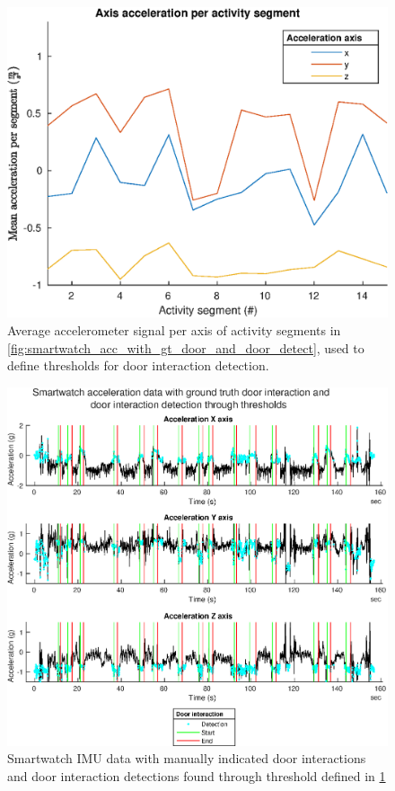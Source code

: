 \begin{figure}[H]
	\centering
	\includegraphics[width=0.6\linewidth]{images/20201114_1858_Axis_acceleration_per_activity_segment}
		\setlength{\belowcaptionskip}{-10pt}
	\caption{ Average accelerometer signal per axis of activity segments in \cref{fig:smartwatch_acc_with_gt_door_and_door_detect}, used to define thresholds for door interaction detection. }
	\label{fig:axis_acceleration_per_activity_segment}
\end{figure}

\begin{figure}[H]
	\centering
	\includegraphics[width=0.8\linewidth]{images/20201123_1013_Acceleration_Z_axis}
	\caption{Smartwatch \ac{IMU} data with manually indicated door interactions and door interaction detections found through threshold defined in \cref{fig:axis_acceleration_per_activity_segment}}
	\label{fig:smart_watch_acc_with_gt_door_and_door_detect_2}
\end{figure}

